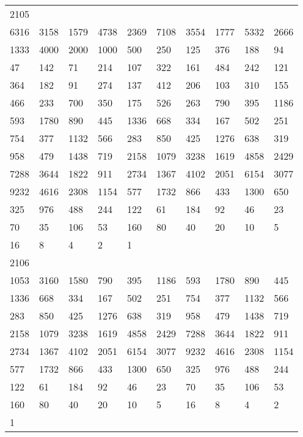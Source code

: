 \begin{longtable}{*{10}{l}}
2105&&&&&&&&&\\
6316& 3158& 1579& 4738& 2369& 7108& 3554& 1777& 5332& 2666\\
1333& 4000& 2000& 1000& 500& 250& 125& 376& 188& 94\\
47& 142& 71& 214& 107& 322& 161& 484& 242& 121\\
364& 182& 91& 274& 137& 412& 206& 103& 310& 155\\
466& 233& 700& 350& 175& 526& 263& 790& 395& 1186\\
593& 1780& 890& 445& 1336& 668& 334& 167& 502& 251\\
754& 377& 1132& 566& 283& 850& 425& 1276& 638& 319\\
958& 479& 1438& 719& 2158& 1079& 3238& 1619& 4858& 2429\\
7288& 3644& 1822& 911& 2734& 1367& 4102& 2051& 6154& 3077\\
9232& 4616& 2308& 1154& 577& 1732& 866& 433& 1300& 650\\
325& 976& 488& 244& 122& 61& 184& 92& 46& 23\\
70& 35& 106& 53& 160& 80& 40& 20& 10& 5\\
16& 8& 4& 2& 1& \\

2106&&&&&&&&&\\
1053& 3160& 1580& 790& 395& 1186& 593& 1780& 890& 445\\
1336& 668& 334& 167& 502& 251& 754& 377& 1132& 566\\
283& 850& 425& 1276& 638& 319& 958& 479& 1438& 719\\
2158& 1079& 3238& 1619& 4858& 2429& 7288& 3644& 1822& 911\\
2734& 1367& 4102& 2051& 6154& 3077& 9232& 4616& 2308& 1154\\
577& 1732& 866& 433& 1300& 650& 325& 976& 488& 244\\
122& 61& 184& 92& 46& 23& 70& 35& 106& 53\\
160& 80& 40& 20& 10& 5& 16& 8& 4& 2\\
1& \\


\end{longtable}
